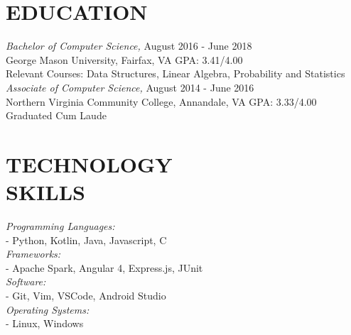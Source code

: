 \documentclass[margin, 10pt]{res} %
\begin{document}
\begin{resume}



\section{EDUCATION}

{\sl Bachelor of Computer Science,}  \hfill August 2016 - June 2018 \\
George Mason University, Fairfax, VA \hfill GPA: 3.41/4.00 \smallskip\\
Relevant Courses: Data Structures, Linear Algebra, Probability and Statistics\\

{\sl Associate of Computer Science,}  \hfill August 2014 - June 2016 \\
Northern Virginia Community College, Annandale, VA \hfill GPA: 3.33/4.00 \smallskip\\
Graduated Cum Laude\\
 

\section{TECHNOLOGY \\ SKILLS} 

{\sl Programming Languages:} \\ \null\qquad - Python, Kotlin, Java, Javascript, C \\
{\sl Frameworks:} \\ \null\qquad - Apache Spark, Angular 4, Express.js, JUnit \\
{\sl Software:} \\ \null\qquad - Git, Vim, VSCode, Android Studio\\
{\sl Operating Systems:} \\ \null\qquad - Linux, Windows \\
 

\end{resume}
\end{document}
